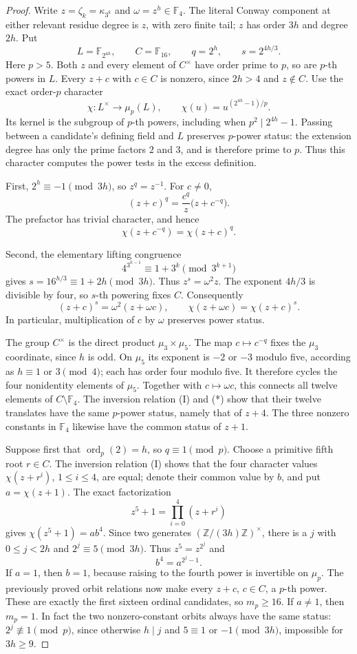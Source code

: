 \documentclass[11pt]{article}
\theoremstyle{definition}
\theoremstyle{remark}
\begin{document}
\begin{proof}
Write $z=\zeta_k=\kappa_{3^k}$ and $\omega=z^h\in\mathbb F_4$.
The literal Conway component at either relevant residue degree is $z$,
with zero finite tail; $z$ has order $3h$ and degree $2h$.
Put
\[
 L=\mathbb F_{2^{4h}},\qquad C=\mathbb F_{16},\qquad
 q=2^h,\qquad s=2^{4h/3}.
\]
Here $p>5$.  Both $z$ and every element of
$C^\times$ have order prime to $p$, so are $p$-th powers in $L$.
Every $z+c$ with $c\in C$ is nonzero, since $2h>4$ and $z\notin C$.
Use the exact order-$p$ character
\[
 \chi:L^\times\longrightarrow\mu_p(L),\qquad
 \chi(u)=u^{(2^{4h}-1)/p}.
\]
Its kernel is the subgroup of $p$-th powers, including when
$p^2\mid2^{4h}-1$.  Passing between a candidate's defining field and
$L$ preserves $p$-power status: the extension degree has only the prime
factors $2$ and $3$, and is therefore prime to $p$.  Thus this character
computes the power tests in the excess definition.

First, $2^h\equiv-1\pmod{3h}$, so $z^q=z^{-1}$.  For $c\ne0$,
\[
 (z+c)^q=\frac{c^q}{z}\bigl(z+c^{-q}\bigr).
\]
The prefactor has trivial character, and hence
\[
 \chi(z+c^{-q})=\chi(z+c)^q.
\tag{I}
\]

Second, the elementary lifting congruence
\[
 4^{3^{k-1}}\equiv1+3^k\pmod{3^{k+1}}
\]
gives $s=16^{h/3}\equiv1+2h\pmod{3h}$.  Thus $z^s=\omega^2z$.
The exponent $4h/3$ is divisible by four, so $s$-th powering fixes $C$.
Consequently
\[
 (z+c)^s=\omega^2(z+\omega c),
 \qquad
 \chi(z+\omega c)=\chi(z+c)^s.
\tag{*}
\]
In particular, multiplication of $c$ by $\omega$ preserves power status.

The group $C^\times$ is the direct product $\mu_3\times\mu_5$.
The map $c\mapsto c^{-q}$ fixes the $\mu_3$ coordinate, since $h$ is odd.
On $\mu_5$ its exponent is $-2$ or $-3$ modulo five, according as
$h\equiv1$ or $3\pmod4$; each has order four modulo five.  It therefore
cycles the four nonidentity elements of $\mu_5$.  Together with
$c\mapsto\omega c$, this connects all twelve elements of
$C\setminus\mathbb F_4$.  The inversion relation (I) and (*) show that their twelve
translates have the same $p$-power status, namely that of $z+4$.
The three nonzero constants in $\mathbb F_4$ likewise have the common
status of $z+1$.

Suppose first that $\operatorname{ord}_p(2)=h$, so $q\equiv1\pmod p$.
Choose a primitive fifth root $r\in C$.  The inversion relation (I) shows that the four character values
$\chi(z+r^i)$, $1\leq i\leq4$, are equal; denote their common value by
$b$, and put $a=\chi(z+1)$.  The exact factorization
\[
 z^5+1=\prod_{i=0}^4(z+r^i)
\]
gives $\chi(z^5+1)=ab^4$.
Since two generates $(\mathbb Z/(3h)\mathbb Z)^\times$, there is a
$j$ with $0\leq j<2h$ and $2^j\equiv5\pmod{3h}$.
Thus $z^5=z^{2^j}$ and
\[
 b^4=a^{2^j-1}.
\]
If $a=1$, then $b=1$, because raising to the fourth power is invertible
on $\mu_p$.  The previously proved orbit relations now make every
$z+c$, $c\in C$, a $p$-th power.  These are exactly the first sixteen
ordinal candidates, so $m_p\geq16$.  If $a\ne1$, then $m_p=1$.
In fact the two nonzero-constant orbits always have the same status:
$2^j\not\equiv1\pmod p$, since otherwise $h\mid j$ and
$5\equiv1$ or $-1\pmod{3h}$, impossible for $3h\geq9$.


\end{proof}
\end{document}

